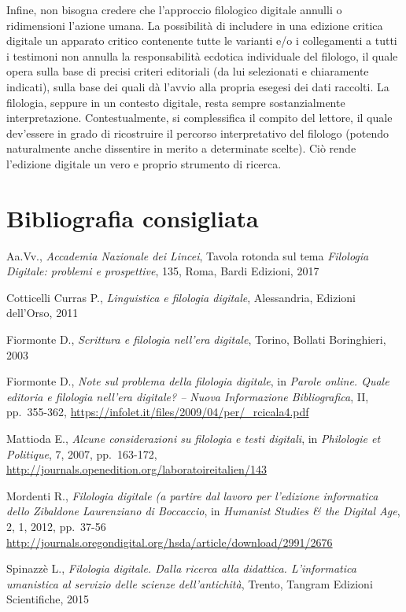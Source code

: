 \documentclass[
  b5paper,
  twoside,
  12pt,
  chapterprefix=false,
  bibliography=totocnumbered,
  parskip=false]{scrbook}
\begin{document}
Infine, non bisogna credere che l'approccio filologico digitale annulli
o ridimensioni l'azione umana. La possibilità di includere in una
edizione critica digitale un apparato critico contenente tutte le
varianti e/o i collegamenti a tutti i testimoni non annulla la
responsabilità ecdotica individuale del filologo, il quale opera sulla
base di precisi criteri editoriali (da lui selezionati e chiaramente
indicati), sulla base dei quali dà l'avvio alla propria esegesi dei dati
raccolti. La filologia, seppure in un contesto digitale, resta sempre
sostanzialmente interpretazione. Contestualmente, si complessifica il
compito del lettore, il quale dev'essere in grado di ricostruire il
percorso interpretativo del filologo (potendo naturalmente anche
dissentire in merito a determinate scelte). Ciò rende l'edizione
digitale un vero e proprio strumento di ricerca.

\hypertarget{bibliografia-consigliata-10}{%
\section*{Bibliografia consigliata}\label{bibliografia-consigliata-10}}

Aa.Vv., \emph{Accademia Nazionale dei Lincei}, Tavola rotonda sul tema
\emph{Filologia Digitale: problemi e prospettive}, 135, Roma, Bardi Edizioni,
2017

Cotticelli Curras P., \emph{Linguistica e filologia digitale}, Alessandria,
Edizioni dell'Orso, 2011

Fiormonte D., \emph{Scrittura e filologia nell'era digitale}, Torino, Bollati
Boringhieri, 2003

Fiormonte D., \emph{Note sul problema della filologia digitale}, in \emph{Parole
online. Quale editoria e filologia nell'era digitale? -- Nuova
Informazione Bibliografica}, II, pp.~355-362,
\url{https://infolet.it/files/2009/04/per/_rcicala4.pdf}

Mattioda E., \emph{Alcune considerazioni su filologia e testi digitali}, in
\emph{Philologie et Politique}, 7, 2007, pp.~163-172,
\url{http://journals.openedition.org/laboratoireitalien/143}

Mordenti R., \emph{Filologia digitale (a partire dal lavoro per l'edizione
informatica dello Zibaldone Laurenziano di Boccaccio}, in \emph{Humanist
Studies \& the Digital Age}, 2, 1, 2012, pp.~37-56
\url{http://journals.oregondigital.org/hsda/article/download/2991/2676}

Spinazzè L., \emph{Filologia digitale. Dalla ricerca alla didattica.
L'informatica umanistica al servizio delle scienze dell'antichità},
Trento, Tangram Edizioni Scientifiche, 2015
\end{document}
